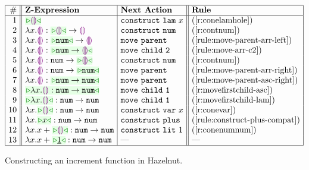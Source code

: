 \begin{figure}[t!]
  \label{ex1}
\begin{center}
$\arraycolsep=4px
\begin{array}{|r||l|l||l|l|}
\hline
\# & \textbf{Z-Expression} &
\textbf{Next Action} & \textbf{Rule}
\\
\hline
1 &
\zwsel{\hhole{}} &
\aConstruct{\flam{x}} &
\text{(\ref{r:conelamhole})}
\\ 2 &
\hlam{x}{\hhole{}} : \tarr{\zwsel{\hhole{}}}{\hhole{}} &
\aConstruct{\fnum{}} &
\text{(\ref{r:contnum})}
\\ 3 &
\hlam{x}{\hhole{}} : \tarr{\zwsel{\tnum{}}}{\hhole{}} &
\aMove{\dParent} &
\text{({\ref{rule:move-parent-arr-left}})}
\\ 4 &
\hlam{x}{\hhole{}} : \zwsel{\tarr{\tnum{}}{\hhole{}}} &
\aMove{\dChildn{2}} &
\text{({\ref{rule:move-arr-c2}})}
\\ 5 &
\hlam{x}{\hhole{}} : \tarr{\tnum}{\zwsel{\hhole{}}}
&
\aConstruct{\fnum{}} &
\text{(\ref{r:contnum})}
\\ 6 &
\hlam{x}{\hhole{}} : \tarr{\tnum{}}{\zwsel{\tnum{}}} &
\aMove{\dParent{}} &
\text{(\ref{rule:move-parent-arr-right})}
\\ 7 &
\hlam{x}{\hhole{}} : \zwsel{\tarr{\tnum{}}{\tnum{}}}
&
\aMove{\dParent{}} &
\text{(\ref{rule:move-parent-asc-right})}
\\ 8 &
\zwsel{\hlam{x}{\hhole{}} : \tarr{\tnum}{\tnum}} &
\aMove{\dChildn{1}} &
\text{(\ref{r:movefirstchild-asc})}
\\ 9 &
\zwsel{\hlam{x}{\hhole{}}} : \tarr{\tnum{}}{\tnum{}} &
\aMove{\dChildn{1}} &
\text{(\ref{r:movefirstchild-lam})}
\\ 10 &
\hlam{x}{\zwsel{\hhole{}}} : \tarr{\tnum{}}{\tnum{}} &
\aConstruct{\fvar{x}} &
\text{(\ref{r:conevar})}
\\ 11 &
\hlam{x}{\zwsel{{x}}} : \tarr{\tnum{}}{\tnum{}} &
{\aConstruct{\fplus}}
&
\text{(\ref{rule:construct-plus-compat})}
\\ 12 &
\hlam{x}{\hadd{x}{\zwsel{\hhole{}}}} : \tarr{\tnum{}}{\tnum{}} &
\aConstruct{\fnumlit{1}} &
\text{(\ref{r:conenumnum})}
\\ 13 &
\hlam{x}{\hadd{x}{\zwsel{\hnum{1}}}} : \tarr{\tnum}{\tnum} &
\textrm{---} &
{\textrm{---}}
\\ \hline
\end{array}
$\end{center}\vspace{-6px}
\caption{Constructing an increment function in Hazelnut.}
\label{fig:first-example}
\end{figure}

